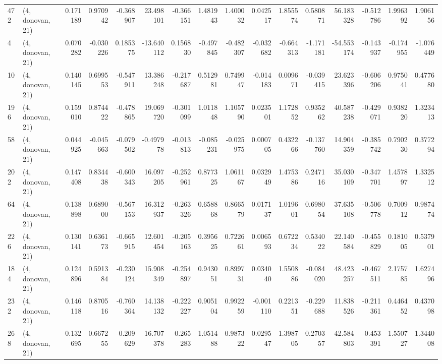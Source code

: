 \begin{tabular}{llrrrrrrrrrrrrrr}
472 &  (4, donovan, 21) &   0.171189 &  0.970942 & -0.368907 &   23.498101 & -0.366151 &   1.481943 &  1.400032 &  0.042517 &  1.855574 &  0.580871 &   56.183328 & -0.512786 &  1.996392 &  1.906156 \\
4   &  (4, donovan, 21) &   0.070282 & -0.030226 &  0.185375 &  -13.640112 &  0.156830 &  -0.497845 & -0.482307 & -0.032682 & -0.664313 & -1.171181 &  -54.553174 & -0.143937 & -0.174955 & -1.076449 \\
10  &  (4, donovan, 21) &   0.140145 &  0.699553 & -0.547911 &   13.386248 & -0.217687 &   0.512981 &  0.749947 & -0.014183 &  0.009671 & -0.039415 &   23.623396 & -0.606206 &  0.975041 &  0.477680 \\
196 &  (4, donovan, 21) &   0.159010 &  0.874422 & -0.478865 &   19.069720 & -0.301099 &   1.011848 &  1.105790 &  0.023501 &  1.172852 &  0.935262 &   40.587238 & -0.429071 &  0.938220 &  1.323413 \\
58  &  (4, donovan, 21) &   0.044925 & -0.045663 & -0.079502 &   -0.497978 & -0.013813 &  -0.085231 & -0.025975 &  0.000705 &  0.432266 & -0.137760 &   14.904359 & -0.385742 &  0.790230 &  0.377294 \\
202 &  (4, donovan, 21) &   0.147408 &  0.834438 & -0.600343 &   16.097205 & -0.252961 &   0.877325 &  1.061167 &  0.032949 &  1.475386 &  0.247116 &   35.030109 & -0.347701 &  1.457897 &  1.332512 \\
64  &  (4, donovan, 21) &   0.138898 &  0.689000 & -0.567153 &   16.312937 & -0.263326 &   0.658868 &  0.866579 &  0.017137 &  1.019601 &  0.698054 &   37.635108 & -0.506778 &  0.700912 &  0.987474 \\
226 &  (4, donovan, 21) &   0.130141 &  0.636173 & -0.665915 &   12.601454 & -0.205163 &   0.395625 &  0.722661 &  0.006593 &  0.672234 &  0.534022 &   22.140584 & -0.455829 &  0.181005 &  0.537901 \\
184 &  (4, donovan, 21) &   0.124896 &  0.591384 & -0.230124 &   15.908349 & -0.254897 &   0.943051 &  0.899731 &  0.034040 &  1.550886 & -0.084020 &   48.423257 & -0.467511 &  2.175785 &  1.627496 \\
232 &  (4, donovan, 21) &   0.146118 &  0.870516 & -0.760364 &   14.138132 & -0.222227 &   0.905104 &  0.992259 & -0.001110 &  0.221351 & -0.229688 &   11.838526 & -0.211361 &  0.446452 &  0.437098 \\
268 &  (4, donovan, 21) &   0.132695 &  0.667255 & -0.209629 &   16.707378 & -0.265283 &   1.051488 &  0.987322 &  0.029547 &  1.398705 &  0.270357 &   42.584803 & -0.453391 &  1.550727 &  1.344008 \\

\end{tabular}
